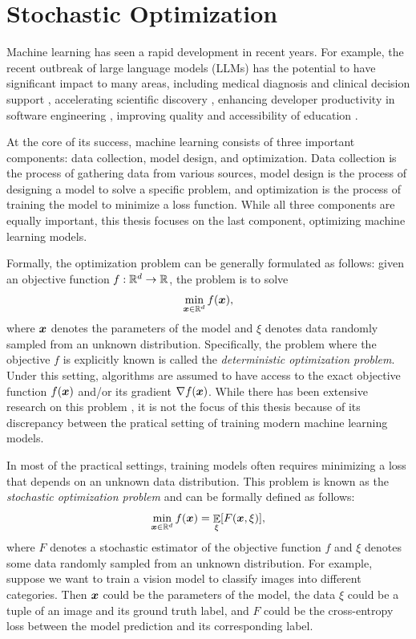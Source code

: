 \section{Stochastic Optimization}
\label{sec:ch1:intro}

Machine learning has seen a rapid development in recent years. For example, the recent outbreak of large language models (LLMs) has the potential to have significant impact to many areas, including medical diagnosis and clinical decision support \citep{clusmann2023future,thirunavukarasu2023large}, accelerating scientific discovery \citep{lin2022evolutionary}, enhancing developer productivity in software engineering \citep{peng2023impact}, improving quality and accessibility of education \citep{kasneci2023chatgpt}.

At the core of its success, machine learning consists of three important components: data collection, model design, and optimization. Data collection is the process of gathering data from various sources, model design is the process of designing a model to solve a specific problem, and optimization is the process of training the model to minimize a loss function. While all three components are equally important, this thesis focuses on the last component, optimizing machine learning models.

Formally, the optimization problem can be generally formulated as follows: given an objective function $f: \mathbb R^d \to \mathbb R$, the problem is to solve
\begin{equation}
    \min_{{\boldsymbol{x}}\in\mathbb R^d} f({\boldsymbol{x}}),
    \label{eqn:ch1:optimization}
\end{equation}
where ${\boldsymbol{x}}$ denotes the parameters of the model and $\xi$ denotes data randomly sampled from an unknown distribution. Specifically, the problem where the objective $f$ is explicitly known is called the \emph{deterministic optimization problem}. Under this setting, algorithms are assumed to have access to the exact objective function $f({\boldsymbol{x}})$ and/or its gradient $\nabla f({\boldsymbol{x}})$. While there has been extensive research on this problem \cite{nemirovskii1979complexity,nesterov1983method,boyd2004convex}, it is not the focus of this thesis because of its discrepancy between the pratical setting of training modern machine learning models. 

In most of the practical settings, training models often requires minimizing a loss that depends on an unknown data distribution. This problem is known as the \emph{stochastic optimization problem} and can be formally defined as follows:
\begin{equation}
    \min_{{\boldsymbol{x}}\in\mathbb R^d} f({\boldsymbol{x}}) = \mathop{\mathbb{E}}_{\xi}[F({\boldsymbol{x}},\xi)],
    \label{eqn:ch1:stochastic-optimization}
\end{equation}
where $F$ denotes a stochastic estimator of the objective function $f$ and $\xi$ denotes some data randomly sampled from an unknown distribution. For example, suppose we want to train a vision model to classify images into different categories. Then ${\boldsymbol{x}}$ could be the parameters of the model, the data $\xi$ could be a tuple of an image and its ground truth label, and $F$ could be the cross-entropy loss between the model prediction and its corresponding label. 

